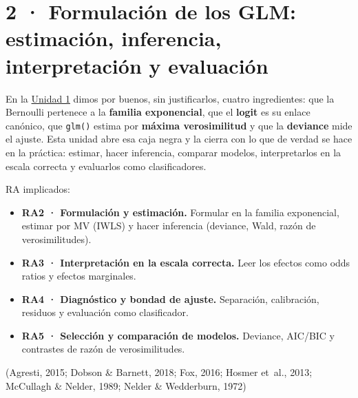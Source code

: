 \documentclass[
  letterpaper,
  DIV=11,
  numbers=noendperiod]{scrartcl}
\providecommand{\tightlist}{%
  \setlength{\itemsep}{0pt}\setlength{\parskip}{0pt}}\usepackage{longtable,booktabs,array}
\begin{document}
\hypertarget{sec-u12}{%
\section{2 · Formulación de los GLM: estimación, inferencia,
interpretación y evaluación}\label{sec-u12}}

En la \protect\hyperlink{sec-u11}{Unidad 1} dimos por buenos, sin
justificarlos, cuatro ingredientes: que la Bernoulli pertenece a la
\textbf{familia exponencial}, que el \textbf{logit} es su enlace
canónico, que \texttt{glm()} estima por \textbf{máxima verosimilitud} y
que la \textbf{deviance} mide el ajuste. Esta unidad abre esa caja negra
y la cierra con lo que de verdad se hace en la práctica: estimar, hacer
inferencia, comparar modelos, interpretarlos en la escala correcta y
evaluarlos como clasificadores.

\begin{tcolorbox}[enhanced jigsaw, breakable, colframe=quarto-callout-note-color-frame, left=2mm, arc=.35mm, colbacktitle=quarto-callout-note-color!10!white, toprule=.15mm, colback=white, coltitle=black, rightrule=.15mm, opacitybacktitle=0.6, title=\textcolor{quarto-callout-note-color}{\faInfo}\hspace{0.5em}{Sobre esta unidad}, titlerule=0mm, toptitle=1mm, bottomtitle=1mm, leftrule=.75mm, bottomrule=.15mm, opacityback=0]

RA implicados:

\begin{itemize}
\tightlist
\item
  \textbf{RA2 · Formulación y estimación.} Formular en la familia
  exponencial, estimar por MV (IWLS) y hacer inferencia (deviance, Wald,
  razón de verosimilitudes).
\item
  \textbf{RA3 · Interpretación en la escala correcta.} Leer los efectos
  como odds ratios y efectos marginales.
\item
  \textbf{RA4 · Diagnóstico y bondad de ajuste.} Separación,
  calibración, residuos y evaluación como clasificador.
\item
  \textbf{RA5 · Selección y comparación de modelos.} Deviance, AIC/BIC y
  contrastes de razón de verosimilitudes.
\end{itemize}

(Agresti, 2015; Dobson \& Barnett, 2018; Fox, 2016; Hosmer et~al., 2013;
McCullagh \& Nelder, 1989; Nelder \& Wedderburn, 1972)

\end{tcolorbox}
\end{document}
